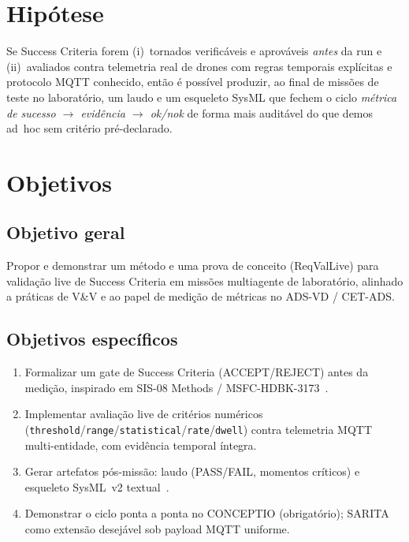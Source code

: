 \section{Hipótese}
\label{sec:hipotese}

Se Success Criteria forem (i)~tornados verificáveis e aprováveis \emph{antes}
da run e (ii)~avaliados contra telemetria real de drones com regras temporais
explícitas e protocolo MQTT conhecido, então é possível produzir, ao final de
missões de teste no laboratório, um laudo e um esqueleto SysML que fechem o ciclo
\emph{métrica de sucesso $\rightarrow$ evidência $\rightarrow$ ok/nok} de forma mais
auditável do que demos ad~hoc sem critério pré-declarado.

\section{Objetivos}
\label{sec:objetivos}

\subsection{Objetivo geral}

Propor e demonstrar um método e uma prova de conceito (ReqValLive) para
validação live de Success Criteria em missões multiagente de laboratório,
alinhado a práticas de V\&V e ao papel de medição de métricas no ADS-VD / CET-ADS.

\subsection{Objetivos específicos}

\begin{enumerate}
  \item Formalizar um gate de Success Criteria (ACCEPT/REJECT) antes da medição,
        inspirado em SIS-08 Methods / MSFC-HDBK-3173~\cite{msfc3173}.
  \item Implementar avaliação live de critérios numéricos
        (\texttt{threshold}/\texttt{range}/\texttt{statistical}/\texttt{rate}/\texttt{dwell}) contra telemetria
        MQTT multi-entidade, com evidência temporal íntegra.
  \item Gerar artefatos pós-missão: laudo (PASS/FAIL, momentos críticos) e
        esqueleto SysML~v2 textual~\cite{sysmlv2}.
  \item Demonstrar o ciclo ponta a ponta no CONCEPTIO (obrigatório); SARITA como
        extensão desejável sob payload MQTT uniforme.
\end{enumerate}

